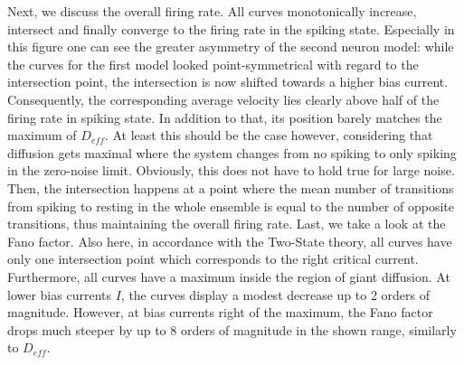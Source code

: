 \documentclass[12pt,a4paper]{article}
\begin{document}
Next, we discuss the overall firing rate. All curves monotonically increase, intersect and finally converge to the firing rate in the spiking state. Especially in this figure one can see the greater asymmetry of the second neuron model: while the curves for the first model looked point-symmetrical with regard to the intersection point, the intersection is now shifted towards a higher bias current. Consequently, the corresponding average velocity lies clearly above half of the firing rate in spiking state. 
In addition to that, its position barely matches the maximum of $D_{eff}$. At least this should be the case however, considering that diffusion gets maximal where the system changes from no spiking to only spiking in the zero-noise limit. Obviously, this does not have to hold true for large noise. Then, the intersection happens at a point where the mean number of transitions from spiking to resting in the whole ensemble is equal to the number of opposite transitions, thus maintaining the overall firing rate.
Last, we take a look at the Fano factor. Also here, in accordance with the Two-State theory, all curves have only one intersection point which corresponds to the right critical current. Furthermore, all curves have a maximum inside the region of giant diffusion. At lower bias currents $I$, the curves display a modest decrease up to 2 orders of magnitude. However, at bias currents right of the maximum, the Fano factor drops much steeper by up to 8 orders of magnitude in the shown range, similarly to $D_{eff}$.

\end{document}
